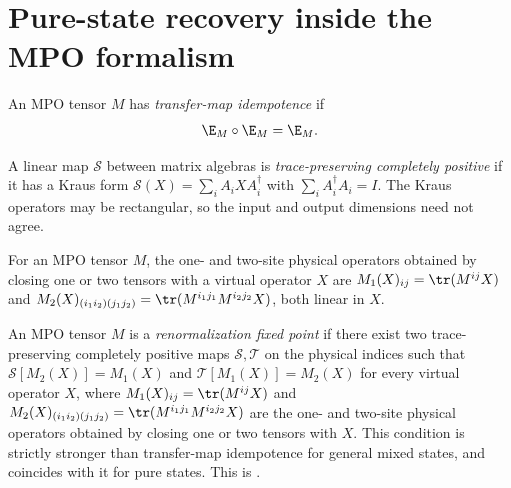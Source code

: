 \section{Pure-state recovery inside the MPO formalism}

\begin{definition}\label{def:is_rfp_mpdo}
    \leanok
    An MPO tensor $M$ has \emph{transfer-map idempotence} if
    \[
        \E_M \circ \E_M = \E_M.
    \]
\end{definition}


\begin{definition}
    \label{def:is_kraus_cptp}
    \leanok
    A linear map $\mathcal{S}$ between matrix algebras is \emph{trace-preserving
        completely positive} if it has a Kraus form
    $\mathcal{S}(X) = \sum_{i} A_i X A_i^\dagger$ with $\sum_i A_i^\dagger A_i = I$.
    The Kraus operators may be rectangular, so the input and output dimensions
    need not agree.
\end{definition}

\begin{definition}
    \label{def:phys_close}
    \leanok
    For an MPO tensor $M$, the one- and two-site physical operators obtained by
    closing one or two tensors with a virtual operator $X$ are
    $M_1(X)_{ij} = \tr(M^{ij} X)$ and
    $M_2(X)_{(i_1 i_2)(j_1 j_2)} = \tr(M^{i_1 j_1} M^{i_2 j_2} X)$, both linear
    in $X$.
\end{definition}

\begin{definition}
    \label{def:is_rfp_via_ts}
    \leanok
    An MPO tensor $M$ is a \emph{renormalization fixed point} if there exist two
    trace-preserving completely positive maps $\mathcal{S}, \mathcal{T}$ on the
    physical indices such that $\mathcal{S}[M_2(X)] = M_1(X)$ and
    $\mathcal{T}[M_1(X)] = M_2(X)$ for every virtual operator $X$, where
    $M_1(X)_{ij} = \tr(M^{ij} X)$ and
    $M_2(X)_{(i_1 i_2)(j_1 j_2)} = \tr(M^{i_1 j_1} M^{i_2 j_2} X)$ are the one-
    and two-site physical operators obtained by closing one or two tensors with
    $X$. This condition is strictly stronger than transfer-map idempotence for
    general mixed states, and coincides with it for pure states.
    This is \cite[Definition~4.1, line~657]{Cirac2016MPDO_arXiv}.
\end{definition}

